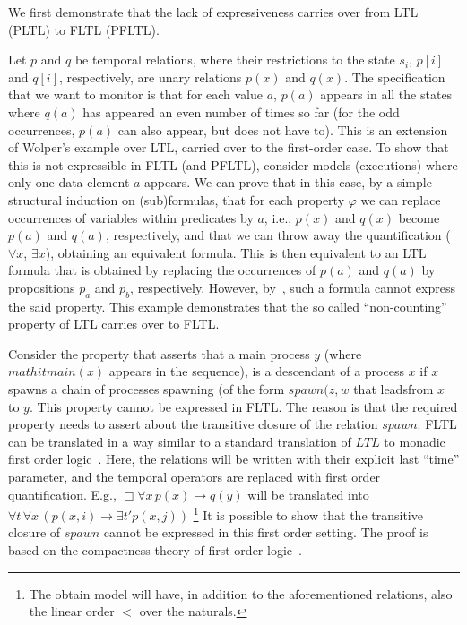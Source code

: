 
We first demonstrate that the lack of expressiveness
carries over from LTL (PLTL) to FLTL (PFLTL).

Let $p$ and $q$ be temporal relations, where their
restrictions to the state $s_i$, $p[i]$ and $q[i]$, respectively, are unary relations $p(x)$ and $q(x)$. The
specification that we want to monitor is that for each value
$a$, $p(a)$ appears in all the states where $q(a)$ has appeared an even number of times so far (for the odd occurrences, $p(a)$ can also appear, but does not have to). This is an extension of
Wolper's example over LTL, carried over to the first-order case. To show that this is not expressible in FLTL (and PFLTL),
consider models (executions) where only one data element $a$ appears. We can prove that in this case, by a simple structural induction on (sub)formulas, that for each property $\varphi$
we can replace occurrences of variables within
predicates by $a$, i.e., $p(x)$ and $q(x)$ become $p(a)$
and $q  (a )$, respectively, and that we can throw away
the quantification ($\forall x$, $\exists x$), obtaining
an equivalent formula. This is then equivalent to
an LTL formula that is obtained by replacing
the occurrences of $p(a)$ and $q(a)$ by propositions
$p_a$ and $p_b$, respectively. However, by~\cite{Wolper},
such a formula cannot express the said property.
This example demonstrates that the so called ``non-counting''~\cite{Thomas} property of LTL carries over
to FLTL. 

\vspace{1ex}
Consider the property that asserts that
a main process $y$ (where
$mathit{main} (x)$ appears
in the sequence), is a descendant of a process $x$ if $x$ spawns a chain of processes spawning (of
the form $\mathit{spawn} (z, w$ that leadsfrom $x$ to $y$. This property cannot be expressed in FLTL. The reason
is that the required property needs to
assert about the transitive closure
of the relation $\mathit{spawn}$. 
FLTL can be translated in a way similar to a standard translation of $LTL$ to monadic first order logic~\cite{Thomas}. Here, the relations will be written with their explicit last ``time'' parameter, and the temporal operators are replaced with first order quantification.
E.g., $\Box \forall x \, p(x) \rightarrow q(y)$ will be translated into $\forall t \, \forall x \, (p(x, i) \rightarrow \exists t' p(x, j) )$
\footnote{The obtain model will have, in addition
to the aforementioned relations, also
the linear order $<$ over the naturals.}
It is possible to show that the transitive closure of $\mathit{spawn}$ cannot be expressed in this first order setting. The proof is based on the
compactness theory of first order logic~\cite{Flum}.

